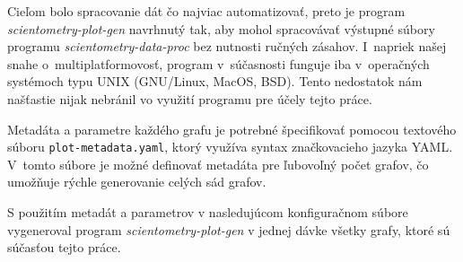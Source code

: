 Cieľom bolo spracovanie dát čo najviac automatizovať, preto je program
\emph{scientometry-plot-gen} navrhnutý tak, aby mohol spracovávať výstupné
súbory programu \emph{scientometry-data-proc} bez nutnosti ručných zásahov.
I~napriek našej snahe o~multiplatformovosť, program v~súčasnosti funguje iba
v~operačných systémoch typu UNIX (GNU/Linux, MacOS, BSD).  Tento nedostatok nám
našťastie nijak nebránil vo využití programu pre účely tejto práce.

Metadáta a parametre každého grafu je potrebné špecifikovať pomocou textového
súboru \verb|plot-metadata.yaml|, ktorý využíva syntax značkovacieho jazyka
YAML.  V~tomto súbore je možné definovať metadáta pre ľubovoľný počet grafov, čo
umožňuje rýchle generovanie celých sád grafov.

S použitím metadát a parametrov v nasledujúcom konfiguračnom súbore vygeneroval
program \emph{scientometry-plot-gen} v jednej dávke všetky grafy, ktoré sú
súčasťou tejto práce.



